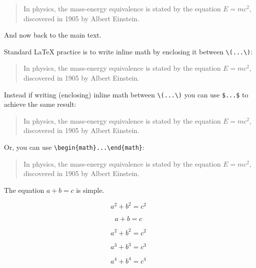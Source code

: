 \documentclass[12pt, letterpaper]{article}
\begin{document}
\begin{quote}
In physics, the mass-energy equivalence is stated 
by the equation \(E=mc^2\), discovered in 1905 by Albert Einstein.
\end{quote}

And now back to the main text.




\noindent Standard \LaTeX{} practice is to write inline math by enclosing it between \verb|\(...\)|:

\begin{quote}
In physics, the mass-energy equivalence is stated 
by the equation \(E=mc^2\), discovered in 1905 by Albert Einstein.
\end{quote}

\noindent Instead if writing (enclosing) inline math between \verb|\(...\)| you can use \texttt{\$...\$} to achieve the same result:

\begin{quote}
In physics, the mass-energy equivalence is stated 
by the equation $E=mc^2$, discovered in 1905 by Albert Einstein.
\end{quote}

\noindent Or, you can use \verb|\begin{math}...\end{math}|:

\begin{quote}
In physics, the mass-energy equivalence is stated 
by the equation \begin{math}E=mc^2\end{math}, discovered in 1905 by Albert Einstein.
\end{quote}








\newpage

The equation $a + b = c$ is simple.

\[ a^2 + b^2 = c^2\]


\begin{equation}
	a + b = c
\end{equation}

\begin{equation}
a^2 + b^2 = c^2
\end{equation}

\begin{equation}
	a^3 + b^3 = c^3
\end{equation}

\begin{equation}
a^4 + b^4 = c^4
\end{equation}
\end{document}
